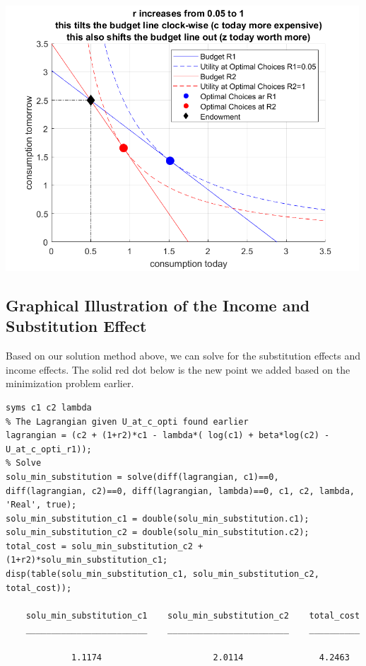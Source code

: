 \documentclass[
]{book}
\begin{document}
\includegraphics[width=5.20833in,height=\textheight]{img/household_c1_c2_constrained_r_change_images/figure_0.png}

\hypertarget{graphical-illustration-of-the-income-and-substitution-effect}{%
\subsection{Graphical Illustration of the Income and Substitution Effect}\label{graphical-illustration-of-the-income-and-substitution-effect}}

Based on our solution method above, we can solve for the substitution
effects and income effects. The solid red dot below is the new point we
added based on the minimization problem earlier.

\begin{verbatim}
syms c1 c2 lambda
% The Lagrangian given U_at_c_opti found earlier
lagrangian = (c2 + (1+r2)*c1 - lambda*( log(c1) + beta*log(c2) - U_at_c_opti_r1));
% Solve
solu_min_substitution = solve(diff(lagrangian, c1)==0, diff(lagrangian, c2)==0, diff(lagrangian, lambda)==0, c1, c2, lambda, 'Real', true);
solu_min_substitution_c1 = double(solu_min_substitution.c1);
solu_min_substitution_c2 = double(solu_min_substitution.c2);
total_cost = solu_min_substitution_c2 + (1+r2)*solu_min_substitution_c1;
disp(table(solu_min_substitution_c1, solu_min_substitution_c2, total_cost));

    solu_min_substitution_c1    solu_min_substitution_c2    total_cost
    ________________________    ________________________    __________

             1.1174                      2.0114               4.2463  
\end{verbatim}
\end{document}
